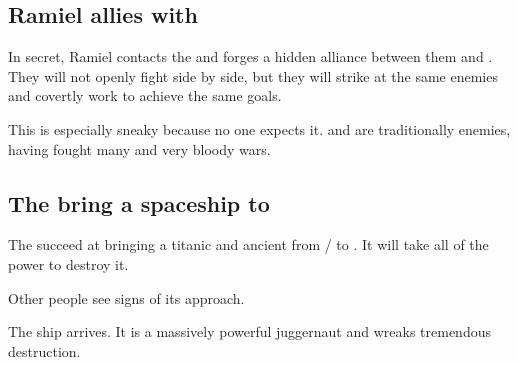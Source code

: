\subsection{Ramiel allies with \Baelzerach}
In secret, Ramiel contacts the \Baelzerach{} and forges a hidden alliance between them and \Mystraacht. They will not openly fight side by side, but they will strike at the same enemies and covertly work to achieve the same goals. 

This is especially sneaky because no one expects it. \Mystraacht{} and \Baelzerach{} are traditionally enemies, having fought many and very bloody wars. 









\subsection{The \banes bring a spaceship to \Miith}
The \banelords{} succeed at bringing a titanic and ancient  from \Erebos/\Nyx{} to \Miith{}. 
It will take all of the \psp{\dragons}{} \xsic{} power to destroy it.

Other people see signs of its approach.


The ship arrives. 
It is a massively powerful juggernaut and wreaks tremendous destruction. 










